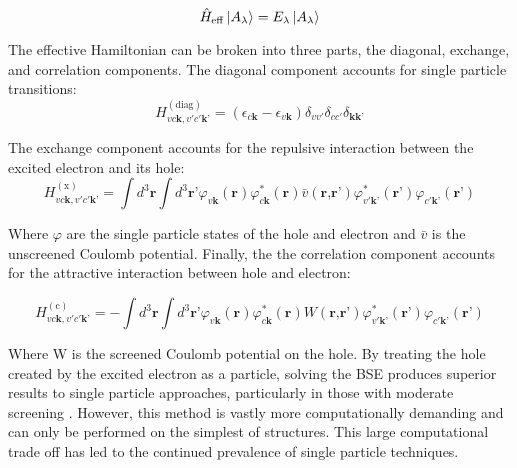 \begin{equation}
\hat{H}_{\mathrm{eff}} \ket{A_\lambda} = E_\lambda \ket{A_\lambda}
\end{equation}


The effective Hamiltonian can be broken into three parts, the diagonal, exchange, and correlation components\cite{draxl_bse_2009}. 
The diagonal component accounts for single particle transitions:
\begin{equation}
	H_{v c \textbf{k}, v' c'\textbf{k'}}^{(\mathrm{diag})} = (\epsilon_{c\textbf{k}}-\epsilon_{v \textbf{k}})\delta_{vv'}\delta_{cc'}\delta_{\textbf{kk'}}
\end{equation}

The exchange component accounts for the repulsive interaction between the excited electron and its hole: 
\begin{equation}
	H_{v c \textbf{k}, v' c'\textbf{k'}}^{(\mathrm{x})} = \int d^3\textbf{r}\int d^3\textbf{r'}\varphi_{v\textbf{k}}(\textbf{r})\varphi_{c\textbf{k}}^*(\textbf{r})\bar{v}(\textbf{r,r'})\varphi_{v'\textbf{k'}}^*(\textbf{r'})\varphi_{c'\textbf{k'}}(\textbf{r'})
\end{equation}

Where $\varphi$ are the single particle states of the hole and electron and $\bar{v}$ is the unscreened Coulomb potential.  Finally, the the correlation component accounts for the attractive interaction between hole and electron:

\begin{equation}
	H_{v c \textbf{k}, v' c'\textbf{k'}}^{(\mathrm{c})} = -\int d^3\textbf{r}\int d^3\textbf{r'}\varphi_{v\textbf{k}}(\textbf{r})\varphi_{c\textbf{k}}^*(\textbf{r})W(\textbf{r,r'})\varphi_{v'\textbf{k'}}^*(\textbf{r'})\varphi_{c'\textbf{k'}}(\textbf{r'})
\end{equation}

Where W is the screened Coulomb potential on the hole. By treating the hole created by the excited electron as a particle, solving the BSE produces superior results to single particle approaches, particularly in those with moderate screening \cite{draxl_bse_2009}.  However, this method is vastly more computationally demanding and can only be performed on the simplest of structures.   This large computational trade off has led to the continued prevalence of single particle techniques.


